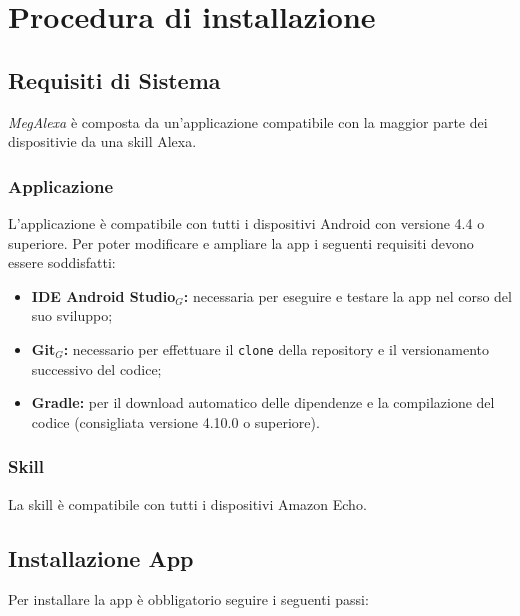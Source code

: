 \chapter{Procedura di installazione}

\section{Requisiti di Sistema}
\label{RequisitSistema}
\textit{MegAlexa} è composta da un'applicazione compatibile con la maggior parte dei dispositivie da una skill Alexa.
\subsection{Applicazione}
L'applicazione è compatibile con tutti i dispositivi Android con versione 4.4 o superiore.
Per poter modificare e ampliare la app i seguenti requisiti devono essere soddisfatti:
\begin{itemize}

	\item \textbf{IDE Android Studio$_{G}$:} necessaria per eseguire e testare la app nel corso del suo sviluppo;
	\item \textbf{Git$_{G}$:} necessario per effettuare il \texttt{clone} della repository e il versionamento successivo del codice;
	\item \textbf{Gradle:} per il download automatico delle dipendenze e la compilazione del codice (consigliata versione 4.10.0 o superiore).

\end{itemize}


\subsection{Skill}
La skill è compatibile con tutti i dispositivi Amazon Echo.

\section{Installazione App} \label{installazioneApp}
Per installare la app è obbligatorio seguire i seguenti passi:

